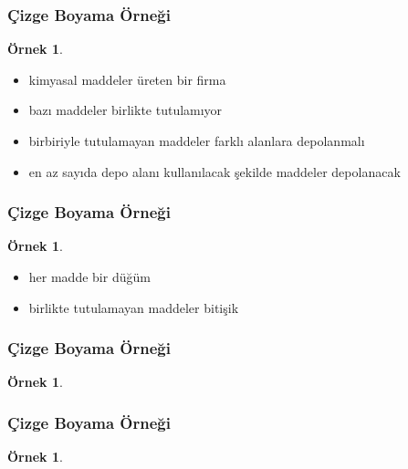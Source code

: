 \documentclass[dvipsnames]{beamer}
\theoremstyle{definition}
\theoremstyle{example}
\newtheorem{ornek}[theorem]{Örnek}
\theoremstyle{plain}
\begin{document}
\begin{frame}
  \frametitle{Çizge Boyama Örneği}

  \begin{ornek}
    \begin{itemize}
      \item kimyasal maddeler üreten bir firma
      \item bazı maddeler birlikte tutulamıyor
      \item birbiriyle tutulamayan maddeler farklı alanlara depolanmalı

      \pause
      \medskip
      \item en az sayıda depo alanı kullanılacak şekilde maddeler depolanacak
    \end{itemize}
  \end{ornek}
\end{frame}

\begin{frame}
  \frametitle{Çizge Boyama Örneği}

  \begin{ornek}
    \begin{itemize}
      \item her madde bir düğüm
      \item birlikte tutulamayan maddeler bitişik
    \end{itemize}

    \begin{center}
    \end{center}
  \end{ornek}
\end{frame}

\begin{frame}
  \frametitle{Çizge Boyama Örneği}

  \begin{ornek}
    \begin{center}
    \end{center}
  \end{ornek}
\end{frame}

\begin{frame}
  \frametitle{Çizge Boyama Örneği}

  \begin{ornek}
    \begin{columns}
      \begin{center}
      \end{center}

      \begin{center}
      \end{center}
    \end{columns}
  \end{ornek}
\end{frame}
\end{document}

